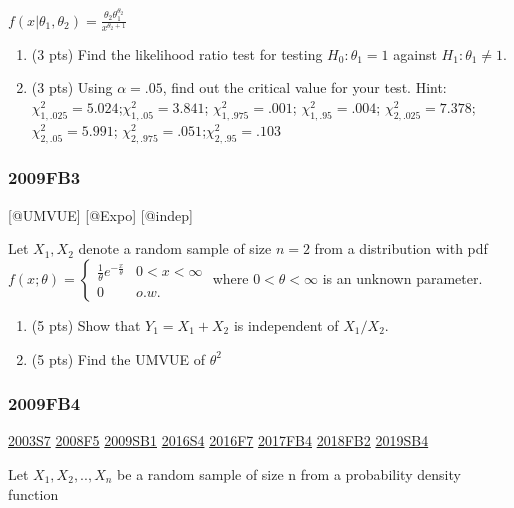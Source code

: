 \documentclass[6pt,twocolumn,Portrait]{article}
\begin{document}
\(f(x|\theta_1,\theta_2)=\frac{\theta_2\theta_1^{\theta_2}}{x^{\theta_2+1}}\)

\begin{enumerate}
\def\labelenumi{(\alph{enumi})}
\setcounter{enumi}{1}
\item
  (3 pts) Find the likelihood ratio test for testing \(H_0:\theta_1=1\)
  against \(H_1:\theta_1\neq1\).
\item
  (3 pts) Using \(\alpha=.05\), find out the critical value for your
  test. Hint: \(\chi^2_{1,.025}= 5.024\);\(\chi^2_{1,.05}= 3.841\);
  \(\chi^2_{1,.975}=.001\); \(\chi^2_{1,.95}=.004\);
  \(\chi^2_{2,.025}=7.378\); \(\chi^2_{2,.05}= 5.991\);
  \(\chi^2_{2,.975}=.051\);\(\chi^2_{2,.95}=.103\)
\end{enumerate}

\hypertarget{fb3}{%
\subsubsection{2009FB3}\label{fb3}}

{[}@UMVUE{]} {[}@Expo{]} {[}@indep{]}

Let \(X_1,X_2\) denote a random sample of size \(n=2\) from a
distribution with pdf
\(f(x;\theta)=\begin{cases}\frac1\theta e^{-\frac{x}\theta}& 0<x<\infty\\0& o.w.\end{cases}\)
where \(0<\theta<\infty\) is an unknown parameter.

\begin{enumerate}
\def\labelenumi{(\alph{enumi})}
\item
  (5 pts) Show that \(Y_1=X_1+X_2\) is independent of \(X_1/X_2\).
\item
  (5 pts) Find the UMVUE of \(\theta^2\)
\end{enumerate}

\hypertarget{fb4}{%
\subsubsection{2009FB4}\label{fb4}}

\protect\hyperlink{s7}{2003S7} \protect\hyperlink{f5-3}{2008F5}
\protect\hyperlink{sb1}{2009SB1} \protect\hyperlink{s4-4}{2016S4}
\protect\hyperlink{f7-5}{2016F7} \protect\hyperlink{fb4-3}{2017FB4}
\protect\hyperlink{fb2-4}{2018FB2} \protect\hyperlink{sb4-2}{2019SB4}

Let \(X_1,X_2,..,X_n\) be a random sample of size n from a probability
density function
\end{document}
